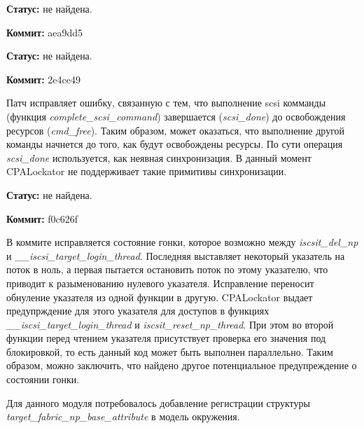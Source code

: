 \textbf{Статус:} не найдена.

\vspace{1cm}

\textbf{Коммит:} aea9dd5


\textbf{Статус:} не найдена.

\vspace{1cm}

\textbf{Коммит:} 2e4ce49

Патч исправляет ошибку, связанную с тем, что выполнение scsi комманды (функция \textit{complete\_scsi\_command}) завершается (\textit{scsi\_done}) до освобождения ресурсов (\textit{cmd\_free}).
Таким образом, может оказаться, что выполнение другой команды начнется до того, как будут освобождены ресурсы. 
По сути операция \textit{scsi\_done} используется, как неявная синхронизация.
В данный момент CPALockator не поддерживает такие примитивы синхронизации.


\textbf{Статус:} не найдена.

\vspace{1cm}

\textbf{Коммит:} f0c626f

В коммите исправляется состояние гонки, которое возможно между \textit{iscsit\_del\_np} и \textit{\_\_iscsi\_target\_login\_thread}.
Последняя выставляет некоторый указатель на поток в ноль, а первая пытается остановить поток по этому указателю, что приводит к разыменованию нулевого указателя.
Исправление переносит обнуление указателя из одной функции в другую.
CPALockator выдает предупрждение для этого указателя для доступов в функциях \textit{\_\_iscsi\_target\_login\_thread} и \textit{iscsit\_reset\_np\_thread}.
При этом во второй функции перед чтением указателя присутствует проверка его значения под блокировкой, то есть данный код может быть выполнен параллельно.
Таким образом, можно заключить, что найдено другое потенциальное предупреждение о состоянии гонки.

Для данного модуля потребовалось добавление регистрации структуры \textit{target\_fabric\_np\_base\_attribute} в модель окружения.

